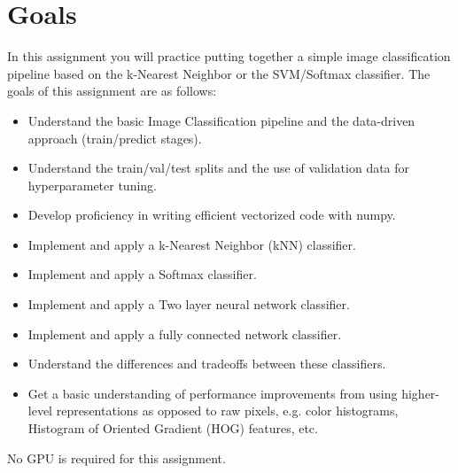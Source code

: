 \section{Goals}

In this assignment you will practice putting together a simple image classification pipeline based on the k-Nearest Neighbor or the SVM/Softmax classifier. 
The goals of this assignment are as follows:

\begin{itemize}
    \item Understand the basic Image Classification pipeline and the data-driven approach (train/predict stages).
    \item Understand the train/val/test splits and the use of validation data for hyperparameter tuning.
    \item Develop proficiency in writing efficient vectorized code with numpy.
    \item Implement and apply a k-Nearest Neighbor (kNN) classifier.
    \item Implement and apply a Softmax classifier.
    \item Implement and apply a Two layer neural network classifier.
    \item Implement and apply a fully connected network classifier.
    \item Understand the differences and tradeoffs between these classifiers.
    \item Get a basic understanding of performance improvements from using higher-level representations as opposed to raw pixels, e.g. color histograms, Histogram of Oriented Gradient (HOG) features, etc.
\end{itemize}


No GPU is required for this assignment.

\newpage